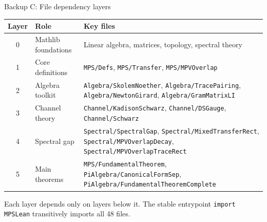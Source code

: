 \documentclass[aspectratio=169,10pt]{beamer}
\begin{document}
\begin{frame}{Backup C: File dependency layers}
    \vspace{-0.6em}

    \renewcommand{\arraystretch}{1.15}
    {\footnotesize
        \begin{tabular}{c p{} p{}}
            \toprule
            \textbf{Layer} & \textbf{Role}       & \textbf{Key files}                                                                                                                           \\
            \midrule
            \rowcolor{cardbg}
            0              & Mathlib foundations & Linear algebra, matrices, topology, spectral theory                                                                                          \\
            \rowcolor{cardbg}
            1              & Core definitions    & \texttt{MPS/Defs}, \texttt{MPS/Transfer}, \texttt{MPS/MPVOverlap}                                                                            \\
            \rowcolor{cardbg}
            2              & Algebra toolkit     & \texttt{Algebra/SkolemNoether}, \texttt{Algebra/TracePairing}, \texttt{Algebra/NewtonGirard}, \texttt{Algebra/GramMatrixLI}                  \\
            \rowcolor{cardbg}
            3              & Channel theory      & \texttt{Channel/KadisonSchwarz}, \texttt{Channel/DSGauge}, \texttt{Channel/Schwarz}                                                          \\
            \rowcolor{cardbg}
            4              & Spectral gap        & \texttt{Spectral/SpectralGap}, \texttt{Spectral/MixedTransferRect}, \texttt{Spectral/MPVOverlapDecay}, \texttt{Spectral/MPVOverlapTraceRect} \\
            \rowcolor{cardbg}
            5              & Main theorems       & \texttt{MPS/FundamentalTheorem}, \texttt{PiAlgebra/CanonicalFormSep}, \texttt{PiAlgebra/FundamentalTheoremComplete}                          \\
            \bottomrule
        \end{tabular}
    }

    \vspace{0.3em}
    \textcolor{dimwhite}{\footnotesize Each layer depends only on layers below it.
        The stable entrypoint \texttt{import MPSLean} transitively imports all 48 files.}
\end{frame}
\end{document}
